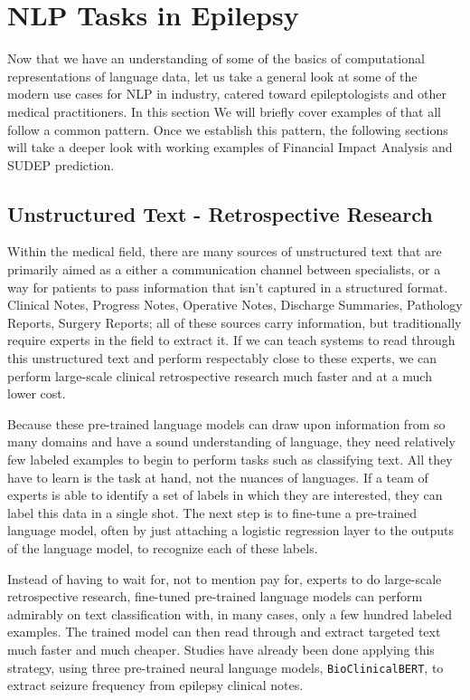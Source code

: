 \section{NLP Tasks in Epilepsy}

Now that we have an understanding of some of the basics of computational representations of language data, let us take a general look at some of the modern use cases for NLP in industry, 
catered toward epileptologists and other medical practitioners. In this section We will briefly cover examples of that all follow a common pattern. Once we establish this pattern, the
following sections will take a deeper look with working examples of Financial Impact Analysis and SUDEP prediction.

\subsection{Unstructured Text - Retrospective Research}
Within the medical field, there are many sources of unstructured text that are primarily aimed as a either a communication channel between specialists, or a way for patients to pass information that isn't captured in a structured format.
Clinical Notes, Progress Notes, Operative Notes, Discharge Summaries, Pathology Reports, Surgery Reports; all of these sources carry information, but traditionally require experts in the field to extract it.
If we can teach systems to read through this unstructured text and perform respectably close to these experts, we can perform large-scale clinical retrospective research much faster and at a much lower cost.

Because these pre-trained language models can draw upon information from so many domains and have a sound understanding of language, they need relatively few
labeled examples to begin to perform tasks such as classifying text. All they have to learn is the task at hand, not the nuances of languages.
If a team of experts is able to identify a set of labels in which they are interested, they can label this data in a single shot. The next step is to fine-tune a pre-trained language model, often by just attaching a logistic regression layer to the outputs of the language model,
to recognize each of these labels.

Instead of having to wait for, not to mention pay for, experts to do large-scale retrospective research, fine-tuned pre-trained language models can perform admirably on text classification with, in many cases, only a few hundred labeled examples.
The trained model can then read through and extract targeted text much faster and much cheaper.
Studies have already been done applying this strategy, using three pre-trained neural language models, \texttt{Bio\textunderscore ClinicalBERT}, to extract
seizure frequency from epilepsy clinical notes.\cite{10.1093/jamia/ocac018}

